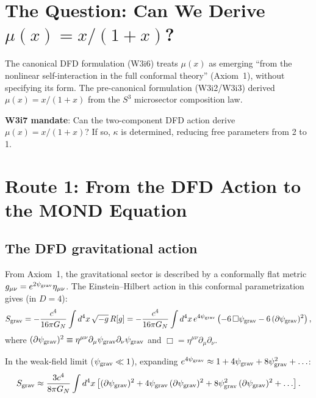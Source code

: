 \documentclass[11pt]{article}
\newcommand{\psigrav}{\psi_{\rm grav}}
\newcommand{\GN}{G_N}
\newcommand{\mufd}{\mu}
\begin{document}
\section{The Question: Can We Derive $\mufd(x) = x/(1+x)$?}
\label{sec:mu-question}

The canonical DFD formulation (W3i6) treats $\mufd(x)$ as emerging
``from the nonlinear self-interaction in the full conformal theory''
(Axiom~1), without specifying its form. The pre-canonical formulation
(W3i2/W3i3) derived $\mufd(x) = x/(1+x)$ from the $S^3$ microsector
composition law.

\textbf{W3i7 mandate}: Can the two-component DFD action derive
$\mufd(x) = x/(1+x)$? If so, $\kappa$ is determined, reducing
free parameters from 2 to 1.

\section{Route 1: From the DFD Action to the MOND Equation}
\label{sec:route1}

\subsection{The DFD gravitational action}

From Axiom~1, the gravitational sector is described by a conformally
flat metric $g_{\mu\nu} = e^{2\psigrav}\eta_{\mu\nu}$. The Einstein--Hilbert
action in this conformal parametrization gives (in $D = 4$):
\begin{equation}
S_{\rm grav} = -\frac{c^4}{16\pi\GN}\int d^4x\,\sqrt{-g}\,R[g]
= -\frac{c^4}{16\pi\GN}\int d^4x\,e^{4\psigrav}\left(
-6\,\Box\psigrav - 6\,(\partial\psigrav)^2\right),
\label{eq:action-conformal}
\end{equation}
where $(\partial\psigrav)^2 \equiv \eta^{\mu\nu}\partial_\mu\psigrav
\partial_\nu\psigrav$ and $\Box = \eta^{\mu\nu}\partial_\mu\partial_\nu$.

In the weak-field limit ($\psigrav \ll 1$), expanding $e^{4\psigrav}
\approx 1 + 4\psigrav + 8\psigrav^2 + \ldots$:
\begin{equation}
S_{\rm grav} \approx \frac{3c^4}{8\pi\GN}\int d^4x\left[
(\partial\psigrav)^2 + 4\psigrav\,(\partial\psigrav)^2
+ 8\psigrav^2\,(\partial\psigrav)^2 + \ldots\right].
\label{eq:action-weak}
\end{equation}
\end{document}
